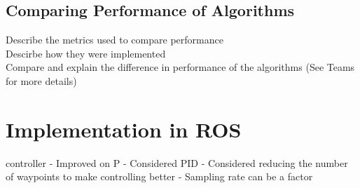 \documentclass[a4paper,12pt]{article}
\begin{document}
			\subsection{Comparing Performance of Algorithms}

		Describe the metrics used to compare performance \\
		Descirbe how they were implemented \\
		Compare and explain the difference in performance of the algorithms (See Teams for more details)


	\section{Implementation in ROS}
	controller 
	- Improved on P
	- Considered PID 
	- Considered reducing the number of waypoints to make controlling better 
	- Sampling rate can be a factor 
	
\end{document}
